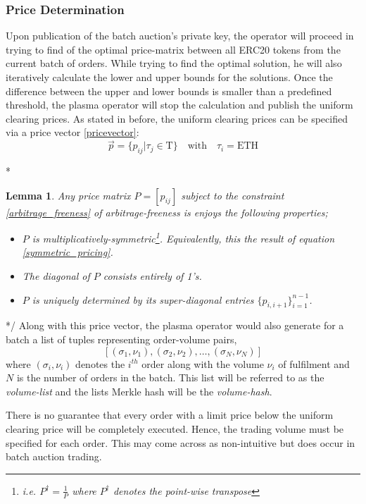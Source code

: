 \documentclass[11pt,parskip=full]{scrartcl}%
\newcommand{\Tau}{\mathrm{T}}
\newtheorem{lemma}[theorem]{Lemma}
\newcommand*{\erc}{ERC20 }
\begin{document}
\subsubsection*{Price Determination}
Upon publication of the batch auction's private key, the operator will proceed in trying to find of the optimal price-matrix between all \erc tokens from the current batch of orders. 
While trying to find the optimal solution, he will also iteratively calculate the lower and upper bounds for the solutions. Once the difference between the upper and lower bounds is smaller than a predefined threshold, the plasma operator will stop the calculation and publish the uniform clearing prices.\newline
As stated in before, the uniform clearing prices can be specified via a price vector \ref{pricevector}:
\begin{equation}
\vec{p}=\{ p_{ij}| \tau_j \in \Tau \} \quad \text{with} \quad \tau_i =\text{ETH}
\end{equation}

\/* 
\begin{lemma}
Any price matrix $P = [p_{ij}]$ subject to the constraint \ref{arbitrage_freeness} of arbitrage-freeness is enjoys the following properties;
\begin{itemize}
\item[(i)] $P$ is multiplicatively-symmetric\footnote{i.e. $P^\dagger = \frac{1}{P}$ where $P^\dagger$ denotes the point-wise transpose}. Equivalently, this the result of equation \ref{symmetric_pricing}.
\item[(ii)] The diagonal of $P$ consists entirely of 1's.
\item[(iii)]  $P$ is uniquely determined by its super-diagonal entries $\{p_{i, i+1}\}_{i=1}^{n-1}$.
\end{itemize}
\end{lemma}
*/
Along with this price vector, the plasma operator would also generate for a batch a list of tuples representing order-volume pairs, 
\[[(\sigma_1, \nu_1), (\sigma_2,  \nu_2), \dots, (\sigma_N, \nu_N)]\]
where $(\sigma_i, \nu_i)$ denotes the $i^{th}$ order along with the volume $\nu_i$ of fulfilment and $N$ is the number of orders in the batch. 
This list will be referred to as the \emph{volume-list}\label{volumeBlock} and the lists Merkle hash will be the \emph{volume-hash}.

There is no guarantee that every order with a limit price below the uniform clearing price will be completely executed. Hence, the trading volume must be specified for each order.
This may come across as non-intuitive but does occur in batch auction trading.
\end{document}
